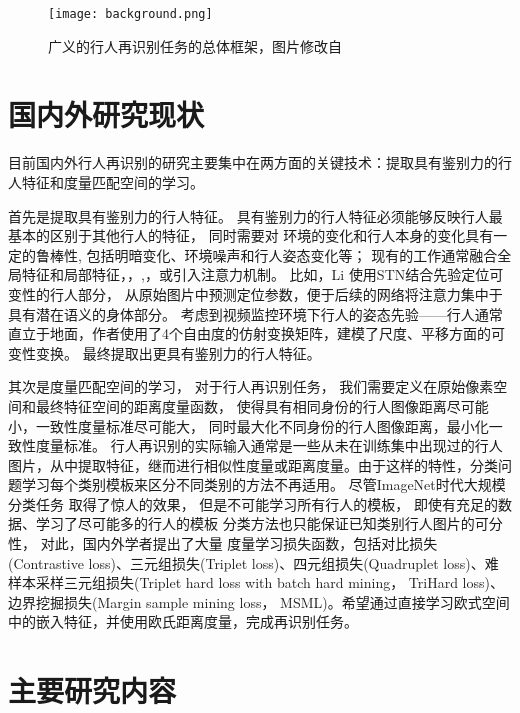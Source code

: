 \begin{figure}
	\texttt{[image: background.png]}
	\caption{广义的行人再识别任务的总体框架，图片修改自~\cite{zheng2017person}}
	\label{fig:overall}
\end{figure}

\section{国内外研究现状}

目前国内外行人再识别的研究主要集中在两方面的关键技术：提取具有鉴别力的行人特征和度量匹配空间的学习。

首先是提取具有鉴别力的行人特征。
具有鉴别力的行人特征必须能够反映行人最基本的区别于其他行人的特征，
同时需要对
环境的变化和行人本身的变化具有一定的鲁棒性,
包括明暗变化、环境噪声和行人姿态变化等；
现有的工作通常融合全局特征和局部特征\cite{reciprocal}，\cite{liu2017hydraplus}，\cite{zhao2017spindle},\cite{glad}，或引入注意力机制。
比如，Li \etal \cite{latent}使用STN结合先验定位可变性的行人部分，
从原始图片中预测定位参数，便于后续的网络将注意力集中于具有潜在语义的身体部分。
考虑到视频监控环境下行人的姿态先验——行人通常直立于地面，作者使用了4个自由度的仿射变换矩阵，建模了尺度、平移方面的可变性变换。
最终提取出更具有鉴别力的行人特征。

其次是度量匹配空间的学习，
对于行人再识别任务，
我们需要定义在原始像素空间和最终特征空间的距离度量函数，
使得具有相同身份的行人图像距离尽可能小，一致性度量标准尽可能大，
同时最大化不同身份的行人图像距离，最小化一致性度量标准。
行人再识别的实际输入通常是一些从未在训练集中出现过的行人图片，从中提取特征，继而进行相似性度量或距离度量。由于这样的特性，分类问题学习每个类别模板来区分不同类别的方法不再适用。 
尽管ImageNet时代大规模分类任务\cite{deng2009imagenet}
取得了惊人的效果，
但是不可能学习所有行人的模板，
即使有充足的数据、学习了尽可能多的行人的模板
分类方法也只能保证已知类别行人图片的可分性，
对此，国内外学者提出了大量
度量学习损失函数，包括对比损失(Contrastive loss)\cite{varior2016gated}、三元组损失(Triplet loss)\cite{schroff2015facenet}、四元组损失(Quadruplet loss)\cite{chen2017beyond}、难样本采样三元组损失(Triplet hard loss with batch hard mining， TriHard loss)\cite{hermans2017defense}、边界挖掘损失(Margin sample mining loss， MSML)\cite{xiao2017margin}。希望通过直接学习欧式空间中的嵌入特征，并使用欧氏距离度量，完成再识别任务。

\section{主要研究内容}

